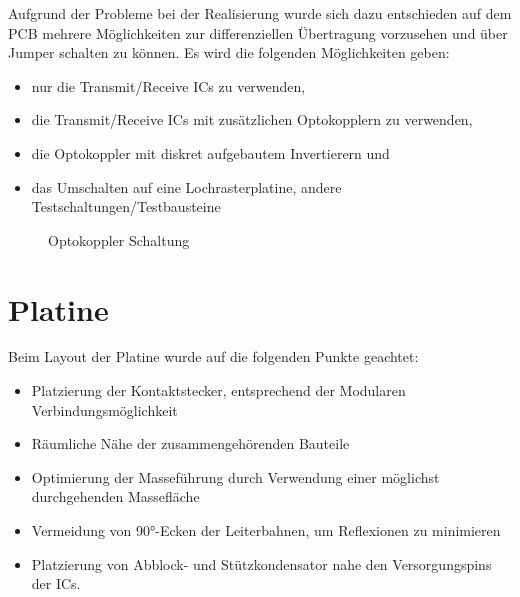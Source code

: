 Aufgrund der Probleme bei der Realisierung wurde sich dazu entschieden auf dem PCB mehrere Möglichkeiten zur differenziellen Übertragung vorzusehen 
und über Jumper schalten zu können. 
Es wird die folgenden Möglichkeiten geben:

\begin{itemize}
\item nur die Transmit/Receive ICs zu verwenden,
\item die Transmit/Receive ICs mit zusätzlichen Optokopplern zu verwenden,
\item die Optokoppler mit diskret aufgebautem Invertierern und
\item das Umschalten auf eine Lochrasterplatine, andere Testschaltungen/Testbausteine
\end{itemize}



\begin{figure}[H]
    \centering    
    \caption{Optokoppler Schaltung}
    \label{Optokoppler}
\end{figure}



\newpage
\section{Platine}
Beim Layout der Platine wurde auf die folgenden Punkte geachtet: 

\begin{itemize}
	\item Platzierung der Kontaktstecker, entsprechend der Modularen Verbindungsmöglichkeit
	\item Räumliche Nähe der zusammengehörenden Bauteile
	\item Optimierung der Masseführung durch Verwendung einer möglichst durchgehenden Massefläche
	\item Vermeidung von 90°-Ecken der Leiterbahnen, um Reflexionen zu minimieren
	\item Platzierung von Abblock- und Stützkondensator nahe den Versorgungspins der ICs.
\end{itemize}




